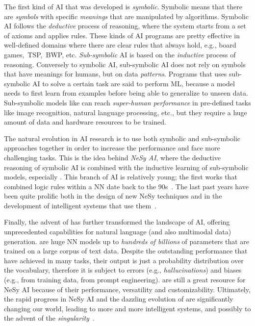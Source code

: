 \begin{refsection}
The first kind of \gls{AI} that was developed is \emph{symbolic}.
%
Symbolic means that there are \emph{symbols} with specific \emph{meanings} that are manipulated by algorithms.
%
Symbolic \gls{AI} follows the \emph{deductive} process of reasoning, where the system starts from a set of axioms and applies rules.
%
These kinds of \gls{AI} programs are pretty effective in well-defined domains where there are clear rules that always hold, e.g., board games,~\gls{TSP},~\gls{BWP}, etc.
%
\emph{Sub-symbolic} \gls{AI} is based on the \emph{inductive} process of reasoning.
%
Conversely to symbolic \gls{AI}, sub-symbolic \gls{AI} does not rely on symbols that have meanings for humans, but on data \emph{patterns}.
%
Programs that uses sub-symbolic \gls{AI} to solve a certain task are said to perform \gls{ML}, because a model needs to first learn from examples before being able to generalize to unseen data.
%
%
Sub-symbolic models like  can reach \emph{super-human performance} in pre-defined tasks like image recognition, natural language processing, etc., but they require a huge amount of data and hardware resources to be trained.


The natural evolution in \gls{AI} research is to use both symbolic and sub-symbolic approaches together in order to increase the performance and face more challenging tasks.
%
This is the idea behind \emph{\gls{NeSy} \gls{AI}}, where the deductive reasoning of symbolic \gls{AI} is combined with the inductive learning of sub-symbolic models, especially .
%
This branch of \gls{AI} is relatively young; the first works that combined logic rules within a \gls{NN} date back to the 90s~\cite{DBLP:conf/aaai/TowellSN90,DBLP:journals/ai/TowellS94}.
%
The last past years have been quite prolific both in the design of new \gls{NeSy} techniques and in the development of intelligent systems that use them~\cite{DBLP:journals/csur/CiattoSAMO24}.


Finally, the advent of  has further transformed the landscape of \gls{AI}, offering unprecedented capabilities for natural language (and also multimodal data) generation.
%
 are huge \gls{NN} models up to \emph{hundreds of billions} of parameters that are trained on a large corpus of text data.
%
Despite the outstanding performance that  have achieved in many tasks, their output is just a probability distribution over the vocabulary, therefore it is subject to errors (e.g., \emph{hallucinations}) and biases (e.g., from training data, from prompt engineering).
%
 are still a great resource for \gls{NeSy} \gls{AI} because of their performance, versatility and customizability.
%
Ultimately, the rapid progress in \gls{NeSy} \gls{AI} and the dazzling evolution of  are significantly changing our world, leading to more and more intelligent systems, and possibly to the advent of the \emph{singularity}~\cite{shanahan2015technological}.



\end{refsection}
